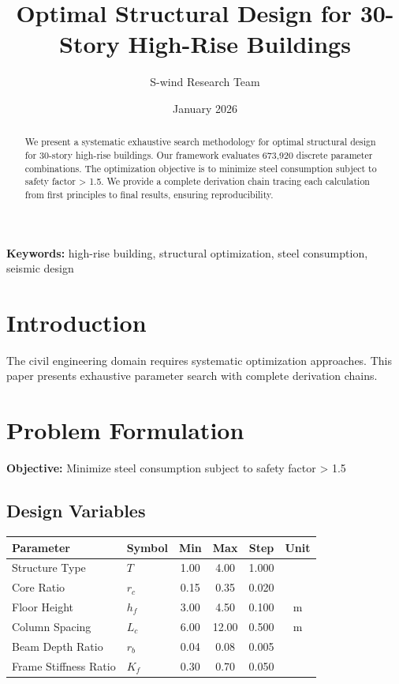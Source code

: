 \documentclass[11pt,a4paper]{article}
\title{Optimal Structural Design for 30-Story High-Rise Buildings}
\author{S-wind Research Team}
\date{January 2026}
\begin{document}
\maketitle

\begin{abstract}
We present a systematic exhaustive search methodology for optimal structural design for 30-story high-rise buildings. Our framework evaluates 673,920 discrete parameter combinations. The optimization objective is to minimize steel consumption subject to safety factor > 1.5. We provide a complete derivation chain tracing each calculation from first principles to final results, ensuring reproducibility.
\end{abstract}

\textbf{Keywords:} high-rise building, structural optimization, steel consumption, seismic design

\section{Introduction}

The civil engineering domain requires systematic optimization approaches. This paper presents exhaustive parameter search with complete derivation chains.

\section{Problem Formulation}

\textbf{Objective:} Minimize steel consumption subject to safety factor > 1.5

\subsection{Design Variables}

\begin{center}
\begin{tabular}{llcccc}
\hline
Parameter & Symbol & Min & Max & Step & Unit \\
\hline
Structure Type & $T$ & 1.00 & 4.00 & 1.000 &  \\
Core Ratio & $r_c$ & 0.15 & 0.35 & 0.020 &  \\
Floor Height & $h_f$ & 3.00 & 4.50 & 0.100 & m \\
Column Spacing & $L_c$ & 6.00 & 12.00 & 0.500 & m \\
Beam Depth Ratio & $r_b$ & 0.04 & 0.08 & 0.005 &  \\
Frame Stiffness Ratio & $K_f$ & 0.30 & 0.70 & 0.050 &  \\
\hline
\end{tabular}
\end{center}
\end{document}
